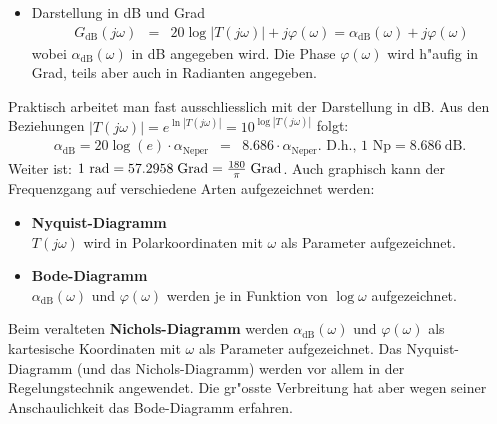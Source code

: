 {\begin{itemize}
\item  Darstellung in dB und Grad
       \begin{eqnarray}
       G_{\text{dB}}(j\omega) &=&  20 \log{|T(j\omega)|} + j \varphi(\omega)=\alpha_{\text{dB}}(\omega)  + j \varphi(\omega) \nonumber
       \end{eqnarray}       
       wobei $\alpha_{\text{dB}}(\omega)$ in dB angegeben wird.  Die Phase
       $\varphi(\omega)$ wird h"aufig in Grad, teils aber auch in
       Radianten angegeben.
\end{itemize}
Praktisch arbeitet man fast ausschliesslich mit der Darstellung in dB.
Aus den Beziehungen $|T(j\omega)|=e^{\ln{|T(j\omega)|}}=
10^{\log{|T(j\omega)|}}$ folgt:
\begin{eqnarray*} 
\alpha_{\text{dB}}=20 \log{(e)}\cdot\alpha_{\text{Neper}}&=&8.686\cdot \alpha_{\text{Neper}}. \mbox{ D.h., 1~Np}=8.686~\text{dB}.
\end{eqnarray*}
Weiter ist: $1 {\rm ~rad}=57.2958 \;{\rm Grad}=\frac{180}{\pi} \;{\rm Grad}$. Auch graphisch kann der Frequenzgang auf verschiedene Arten
aufgezeichnet werden:
\begin{itemize}
\item {\bf Nyquist-Diagramm}\\
      $T(j\omega)$ wird in Polarkoordinaten mit $\omega$ als Parameter 
      aufgezeichnet.
\item {\bf Bode-Diagramm}\\
      $\alpha_{\text{dB}}(\omega)$ und $\varphi(\omega)$ werden je in Funktion von 
      $\log{\omega}$ aufgezeichnet.
\end{itemize}
Beim veralteten
{\bf Nichols-Diagramm}
werden $\alpha_{\text{dB}}(\omega)$ und $\varphi(\omega)$ als
kartesische Koordinaten mit $\omega$ als Parameter aufgezeichnet. Das
Nyquist-Diagramm (und das Nichols-Diagramm) werden vor allem in der
Regelungstechnik angewendet.  Die gr"osste Verbreitung hat aber wegen
seiner Anschaulichkeit das Bode-Diagramm erfahren.  
}
